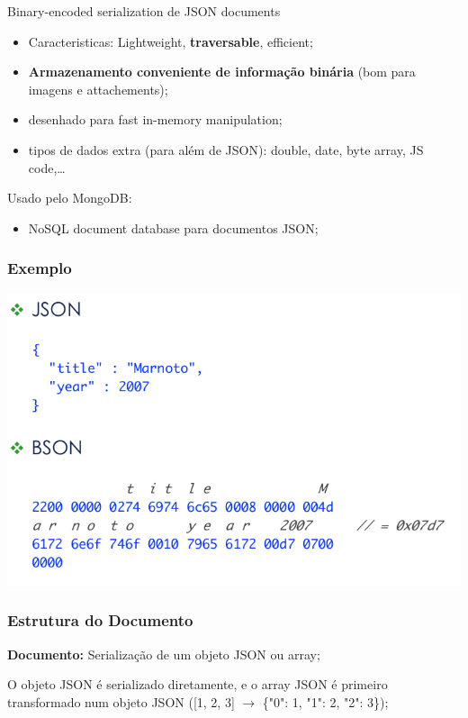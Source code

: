 \documentclass{article}
\begin{document}
Binary-encoded serialization de JSON documents
\begin{itemize}
  \item Caracteristicas: Lightweight, \textbf{traversable}, efficient;
  \item \textbf{Armazenamento conveniente de informação binária} (bom para imagens e attachements);
  \item desenhado para fast in-memory manipulation;
  \item tipos de dados extra (para além de JSON): double, date, byte array, JS code,\dots
\end{itemize}

Usado pelo MongoDB:
\begin{itemize}
  \item NoSQL document database para documentos JSON;
\end{itemize}

\subsubsection*{Exemplo}

\begin{center}
  \includegraphics[scale=0.3]{57}
\end{center}

\pagebreak

\subsubsection*{Estrutura do Documento}

\begin{flushleft}
  \textbf{Documento:} Serialização de um objeto JSON ou array;

  O objeto JSON é serializado diretamente, e o array JSON é primeiro transformado
  num objeto JSON ([1, 2, 3] $\rightarrow$ \{"0": 1, "1": 2, "2": 3\});
\end{flushleft}
\end{document}
